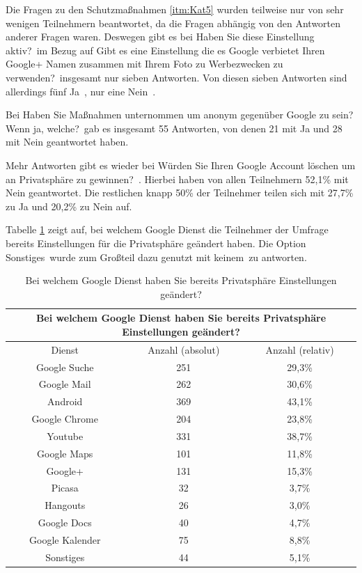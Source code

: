 Die Fragen zu den Schutzmaßnahmen \ref{itm:Kat5} wurden teilweise nur von sehr wenigen Teilnehmern beantwortet, da die Fragen abhängig von den Antworten anderer Fragen waren. Deswegen gibt es bei \glqq Haben Sie diese Einstellung aktiv?\grqq\ im Bezug auf \glqq Gibt es eine Einstellung die es Google verbietet Ihren Google+ Namen zusammen mit Ihrem Foto zu Werbezwecken zu verwenden?\grqq\ insgesamt nur sieben Antworten. Von diesen sieben Antworten sind allerdings fünf \glqq Ja\grqq\ , nur eine \glqq Nein\grqq\ .

Bei \glqq Haben Sie Maßnahmen unternommen um anonym gegenüber Google zu sein? Wenn ja, welche?\grqq\ gab es insgesamt 55 Antworten, von denen 21 mit Ja und 28 mit Nein geantwortet haben. 

Mehr Antworten gibt es wieder bei \glqq Würden Sie Ihren Google Account löschen um an Privatsphäre zu gewinnen?\grqq\ . Hierbei haben von allen Teilnehmern 52,1\% mit Nein geantwortet. Die restlichen knapp 50\% der Teilnehmer teilen sich mit 27,7\% zu Ja und 20,2\% zu Nein auf.

Tabelle \ref{changedprivacy} zeigt auf, bei welchem Google Dienst die Teilnehmer der Umfrage bereits Einstellungen für die Privatsphäre geändert haben. Die Option \glqq Sonstiges\grqq\ wurde zum Großteil dazu genutzt mit \glqq keinem\grqq\ zu antworten.
\begin{table}
	\begin{tabular}[]{ c || c | c }
	\multicolumn{3}{c}{Bei welchem Google Dienst haben Sie bereits Privatsphäre Einstellungen geändert?}\\\hline
	Dienst & Anzahl (absolut) & Anzahl (relativ)\\\hline\hline
	Google Suche & 251 & 29,3\%\\
	Google Mail & 262 & 30,6\%\\
	Android & 369 & 43,1\%\\
	Google Chrome & 204 & 23,8\%\\
	Youtube & 331 & 38,7\%\\
	Google Maps & 101 & 11,8\%\\
	Google+ & 131 & 15,3\%\\
	Picasa & 32 & 3,7\%\\
	Hangouts & 26 & 3,0\%\\
	Google Docs & 40 & 4,7\%\\
	Google Kalender & 75 & 8,8\%\\
	Sonstiges & 44 & 5,1\%\\
	\end{tabular}
	\caption{Bei welchem Google Dienst haben Sie bereits Privatsphäre Einstellungen geändert?}\label{changedprivacy}
\end{table}

